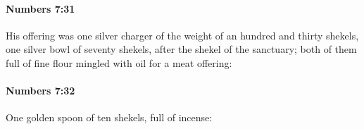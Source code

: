 		\paragraph{Numbers 7:31} %
			\label{NUMBERS-7-31}

			His offering was one silver charger of the weight of an hundred and thirty shekels, one silver bowl of seventy shekels, after the shekel of the sanctuary; both of them full of fine flour mingled with oil for a meat offering:


		\paragraph{Numbers 7:32} %
			\label{NUMBERS-7-32}

			One golden spoon of ten shekels, full of incense:


